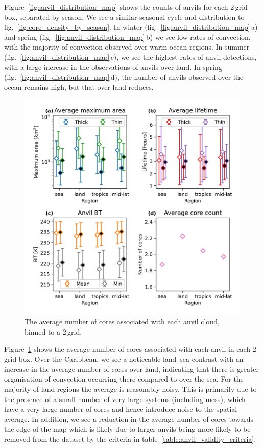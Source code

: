 Figure~\ref{fig:anvil_distribution_map} shows the counts of anvils for each 2\,\textdegree grid box, separated by season.
We see a similar seasonal cycle and distribution to fig.~\ref{fig:core_density_by_season}.
In winter (fig.~\ref{fig:anvil_distribution_map}\,a) and spring (fig.~\ref{fig:anvil_distribution_map}\,b) we see low rates of convection, with the majority of convection observed over warm ocean regions.
In summer (fig.~\ref{fig:anvil_distribution_map}\,c), we see the highest rates of anvil detections, with a large increase in the observations of anvils over land.
In spring (fig.~\ref{fig:anvil_distribution_map}\,d), the number of anvils observed over the ocean remains high, but that over land reduces.

\begin{figure}[tp]
    \centering
    \includegraphics[width=\textwidth]{figures/chapter2_22.png}
    \caption[
    The average number of cores associated with each anvil cloud
    ]{
    The average number of cores associated with each anvil cloud, binned to a 2\,\textdegree grid.
    }
    \label{fig:anvil_number_of_cores_map}
\end{figure}

Figure~\ref{fig:anvil_number_of_cores_map} shows the average number of cores associated with each anvil in each 2\,\textdegree grid box.
Over the Caribbean, we see a noticeable land--sea contrast with an increase in the average number of cores over land, indicating that there is greater organisation of convection occurring there compared to over the sea.
For the majority of land regions the average is reasonably noisy.
This is primarily due to the presence of a small number of very large systems (including \acrshort{mcs}s), which have a very large number of cores and hence introduce noise to the spatial average.
In addition, we see a reduction in the average number of cores towards the edge of the map which is likely due to larger anvils being more likely to be removed from the dataset by the criteria in table~\ref{table:anvil_validity_criteria}.

